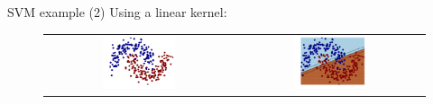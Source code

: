 \begin{frame}{SVM example (2)}
Using a linear kernel:
\begin{figure}
\begin{tabular}{cc}
\includegraphics[width=0.4\textwidth]{img/svm/linear_kernel_21.pdf}&
\includegraphics[width=0.4\textwidth]{img/svm/linear_kernel_22.pdf}
\end{tabular}
\end{figure}
\end{frame}